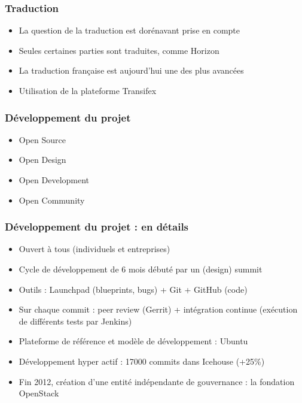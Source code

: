   \begin{frame}
    \frametitle{Traduction}
    \begin{itemize}
      \item La question de la traduction est dorénavant prise en compte
      \item Seules certaines parties sont traduites, comme Horizon
      \item La traduction française est aujourd'hui une des plus avancées
      \item Utilisation de la plateforme Transifex
    \end{itemize}
  \end{frame}

  \begin{frame}
    \frametitle{Développement du projet}
    \begin{itemize}
      \item Open Source
      \item Open Design
      \item Open Development
      \item Open Community
    \end{itemize}
  \end{frame}

  \begin{frame}
    \frametitle{Développement du projet : en détails}
    \begin{itemize}
      \item Ouvert à tous (individuels et entreprises)\pause
      \item Cycle de développement de 6 mois débuté par un (design) summit\pause
      \item Outils : Launchpad (blueprints, bugs) + Git + GitHub (code)\pause
      \item Sur chaque commit : peer review (Gerrit) + intégration continue (exécution de différents tests par Jenkins)\pause
      \item Plateforme de référence et modèle de développement : Ubuntu\pause
      \item Développement hyper actif : 17000 commits dans Icehouse (+25\%)\pause
      \item Fin 2012, création d'une entité indépendante de gouvernance : la fondation OpenStack
    \end{itemize}
  \end{frame}


